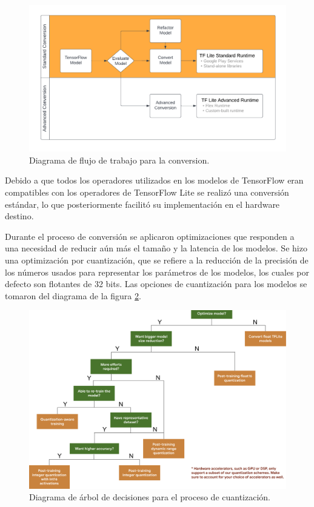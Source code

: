 \begin{figure}[h]
	\centering
	\includegraphics[scale=0.68]{./Figures/tf_convert_workflow_diag.png}
	\caption{Diagrama de flujo de trabajo para la conversion\protect\footnotemark.}
	\label{fig:tf2tflite_workflow}
\end{figure}

Debido a que todos los operadores utilizados en los modelos de TensorFlow eran compatibles con los operadores de TensorFlow Lite se realizó una conversión estándar, lo que posteriormente facilitó su implementación en el hardware destino.

Durante el proceso de conversión se aplicaron optimizaciones que responden a una necesidad de reducir aún más el tamaño y la latencia de los modelos. Se hizo una optimización por cuantización, que se refiere a la reducción de la precisión de los números usados para representar los parámetros de los modelos, los cuales por defecto son flotantes de 32 bits. Las opciones de cuantización para los modelos se tomaron del diagrama de la figura \ref{fig:tf_quantization_tree}.

\begin{figure}[h]
	\centering
	\includegraphics[scale=0.33]{./Figures/tf_quantization_decision_tree.png}
	\caption{Diagrama de árbol de decisiones para el proceso de cuantización\protect\footnotemark.}
	\label{fig:tf_quantization_tree}
\end{figure}

